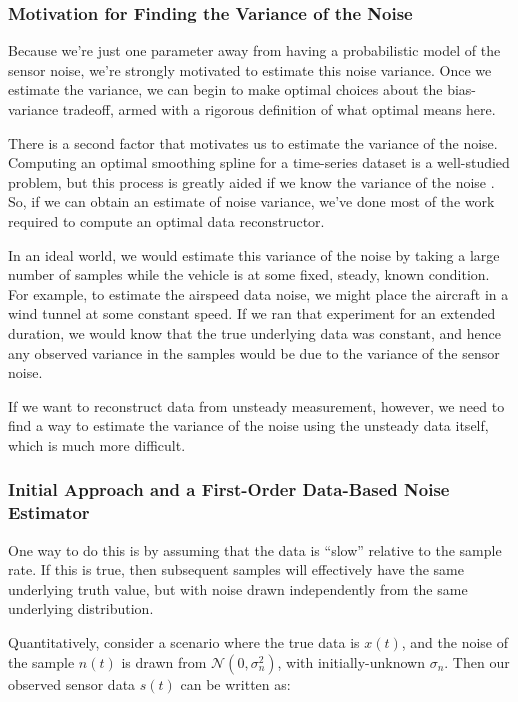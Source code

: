 \documentclass[conf]{new-aiaa}
\begin{document}
    \subsubsection{Motivation for Finding the Variance of the Noise}

    Because we're just one parameter away from having a probabilistic model of the sensor noise, we're strongly motivated to estimate this noise variance. Once we estimate the variance, we can begin to make optimal choices about the bias-variance tradeoff, armed with a rigorous definition of what optimal means here.

    There is a second factor that motivates us to estimate the variance of the noise. Computing an optimal smoothing spline for a time-series dataset is a well-studied problem, but this process is greatly aided if we know the variance of the noise \cite{wahba}. So, if we can obtain an estimate of noise variance, we've done most of the work required to compute an optimal data reconstructor.

    In an ideal world, we would estimate this variance of the noise by taking a large number of samples while the vehicle is at some fixed, steady, known condition. For example, to estimate the airspeed data noise, we might place the aircraft in a wind tunnel at some constant speed. If we ran that experiment for an extended duration, we would know that the true underlying data was constant, and hence any observed variance in the samples would be due to the variance of the sensor noise.

    If we want to reconstruct data from unsteady measurement, however, we need to find a way to estimate the variance of the noise using the unsteady data itself, which is much more difficult.

    \subsubsection{Initial Approach and a First-Order Data-Based Noise Estimator}

    One way to do this is by assuming that the data is ``slow'' relative to the sample rate. If this is true, then subsequent samples will effectively have the same underlying truth value, but with noise drawn independently from the same underlying distribution.

    Quantitatively, consider a scenario where the true data is $x(t)$, and the noise of the sample $n(t)$ is drawn from $\mathcal{N}(0, \sigma^2_n)$, with initially-unknown $\sigma_n$. Then our observed sensor data $s(t)$ can be written as:
\end{document}
